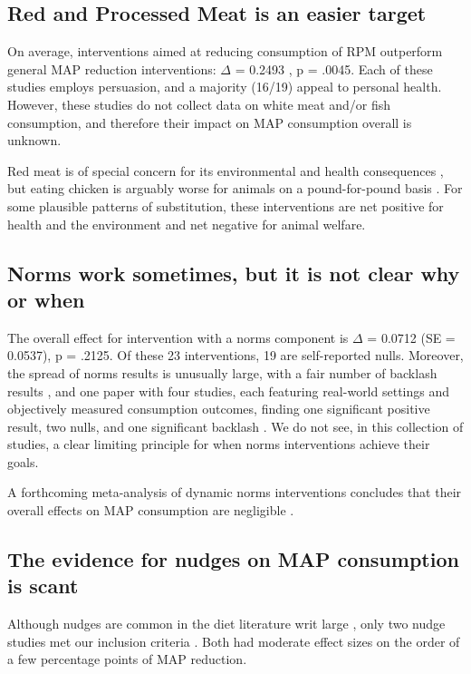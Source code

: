 \documentclass[sn-nature,pdflatex]{sn-jnl}
\begin{document}
\subsection{Red and Processed Meat is an easier target}\label{sec2.4}

On average, interventions aimed at reducing consumption of RPM
outperform general MAP reduction interventions: \(\Delta\) = 0.2493
, p = .0045. Each of these studies employs
persuasion, and a majority (16/19) appeal to personal health. However,
these studies do not collect data on white meat and/or fish consumption,
and therefore their impact on MAP consumption overall is unknown.

Red meat is of special concern for its environmental and health
consequences \citep{grummon2023}, but eating chicken is arguably worse
for animals on a pound-for-pound basis \citep{mathur2022ethical}. For
some plausible patterns of substitution, these interventions are net
positive for health and the environment and net negative for animal
welfare.

\subsection{Norms work sometimes, but it is not clear why or
when}\label{sec2.5}

The overall effect for intervention with a norms component is \(\Delta\)
= 0.0712 (SE = 0.0537), p = .2125. Of these 23 interventions, 19 are
self-reported nulls. Moreover, the spread of norms results is unusually
large, with a fair number of backlash results
\citep{mattson2020, griesoph2021}, and one paper with four studies, each
featuring real-world settings and objectively measured consumption
outcomes, finding one significant positive result, two nulls, and one
significant backlash \citep{sparkman2020}. We do not see, in this
collection of studies, a clear limiting principle for when norms
interventions achieve their goals.

A forthcoming meta-analysis of dynamic norms interventions concludes
that their overall effects on MAP consumption are negligible
\citep{Weikertova2024}.

\subsection{The evidence for nudges on MAP consumption is
scant}\label{sec2.6}

Although nudges are common in the diet literature writ large
\citep{olafsson2024, cadario2020, szaszi2018}, only two nudge studies
met our inclusion criteria \citep{andersson2021}. Both had moderate
effect sizes on the order of a few percentage points of MAP reduction.
\end{document}
